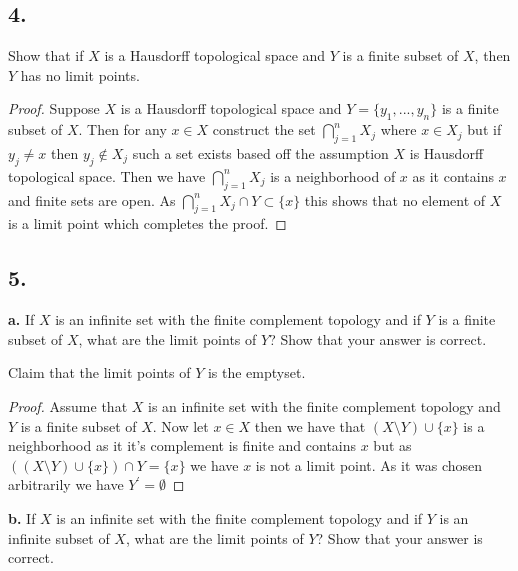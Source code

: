 \documentclass{amsart}
\theoremstyle{plain}
\theoremstyle{definition}
\theoremstyle{remark}
\begin{document}
\vspace{.15in}

\noindent
\subsection*{4.}  Show that if $X$ is a Hausdorff topological space and $Y$ is a finite subset of $X$, then $Y$ has no limit points. 

\begin{proof}
    Suppose $X$ is a Hausdorff topological space and $Y=\{y_1,...,y_n\}$ is a finite subset of $X$. Then for any $x\in X$ construct the set $\bigcap_{j=1}^nX_j$ where $x \in X_j$ but if $y_j\not = x$ then $y_j\not \in X_j$ such a set exists based off the assumption $X$ is Hausdorff topological space. Then we have $\bigcap_{j=1}^nX_j$ is a neighborhood of $x$ as it contains $x$ and finite sets are open. As $\bigcap_{j=1}^nX_j\cap Y\subset \{x\}$ this shows that no element of $X$ is a limit point which completes the proof.
    
\end{proof}



\vspace{.15in}

\noindent
\subsection*{5.} 

{\bfseries a.} If $X$ is an infinite set with the finite complement topology and if $Y$ is a finite subset of $X$, what are the limit points of $Y$? Show that your answer is correct. 

Claim that the limit points of $Y$ is the emptyset. 
\begin{proof}
    Assume that $X$ is an infinite set with the finite complement topology and $Y$ is a finite subset of $X$. Now let $x\in X$ then we have that $(X\setminus Y)\cup \{x\}$ is a neighborhood as it it's complement is finite and contains $x$ but as $((X\setminus Y)\cup \{x\})\cap Y=\{x\}$ we have $x$ is not a limit point. As it was chosen arbitrarily we have $Y^\prime=\emptyset$  
\end{proof}


\vspace{.1in}
{\bfseries b.} If $X$ is an infinite set with the finite complement topology and if $Y$ is an infinite subset of $X$, what are the limit points of $Y$? Show that your answer is correct. 
\end{document}
